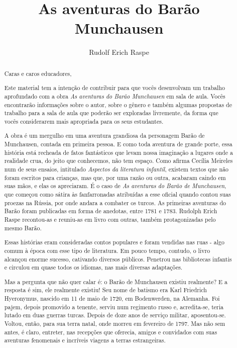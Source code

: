 \documentclass[11pt]{extarticle}
\newcommand{\AutorLivro}{Rudolf Erich Raspe}
\newcommand{\TituloLivro}{As aventuras do Barão Munchausen}
\newcommand{\colaborador}{Gabriela Karam}
\begin{document}
\title{\TituloLivro}
\author{\AutorLivro}
\def\authornotes{\colaborador}

\date{}
\maketitle


\tableofcontents


\begin{abstract}

Caras e caros educadores,

Este material tem a intenção de contribuir para que vocês desenvolvam um trabalho aprofundado com a obra \textit{As aventuras do Barão Munchausen} em sala de aula.
Vocês encontrarão informações sobre o autor, sobre o gênero e também 
algumas propostas de trabalho para a sala de aula que poderão ser exploradas livremente, 
da forma que vocês considerarem mais apropriada para os seus estudantes.

A obra é um mergulho em uma aventura grandiosa da personagem Barão de Munchausen, contada em primeira pessoa. E como toda aventura de grande porte, essa história está recheada de fatos fantásticos que levam nossa imaginação a lugares onde a realidade crua, do jeito que conhecemos, não tem espaço. Como afirma Cecília Meireles num de seus ensaios, intitulado \textit{Aspectos da literatura infantil}, existem textos que não foram escritos para crianças, mas que, por uma razão ou outra, acabaram caindo em suas mãos, e elas os apreciaram. É o caso de \textit{As aventuras do Barão de Munchausen}, que começou como sátira às fanfarronadas atribuídas a esse oficial quando contou suas proezas na Rússia, por onde andara a combater os turcos. As primeiras aventuras do Barão foram publicadas em forma de anedotas, entre 1781 e 1783. Rudolph Erich Raspe recontou-as e reuniu-as em livro com outras, também protagonizadas pelo mesmo Barão. 

Essas histórias eram consideradas contos populares e foram vendidas nas ruas - algo comum à época com esse tipo de literatura. Em pouco tempo, contudo, o livro alcançou enorme sucesso, cativando diversos públicos. Penetrou nas bibliotecas infantis e circulou em quase todos os idiomas, nas mais diversas adaptações. 

Mas a pergunta que não quer calar é: o Barão de Munchausen existiu realmente? E a resposta é sim, ele realmente existiu! Seu nome de batismo era Karl Friedrich Hyeronymus, nascido em 11 de maio de 1720, em Bodenwerden, na Alemanha. Foi pajem, depois promovido a tenente, serviu num regimento russo e, acredita-se, teria lutado em duas guerras turcas. Depois de doze anos de serviço militar, aposentou-se. Voltou, então, para sua terra natal, onde morreu em fevereiro de 1797. Mas não sem antes, é claro, entreter, nas recepções que oferecia, amigos e convidados com suas aventuras fenomenais e incríveis viagens a terras estrangeiras. 


\end{abstract}
\end{document}
